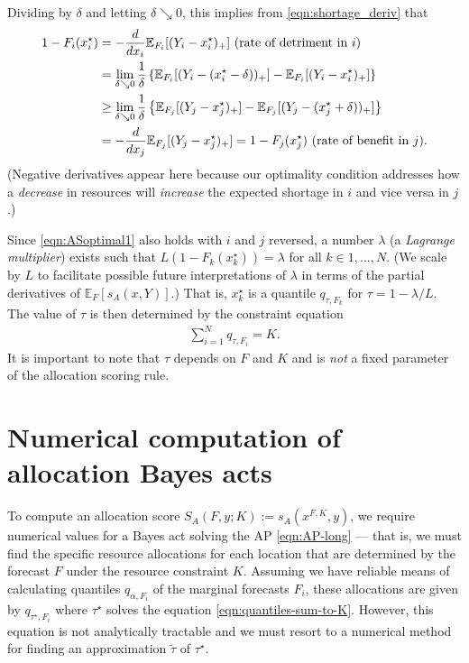 \documentclass{article}\usepackage[]{graphicx}\usepackage[]{xcolor}
\begin{document}
Dividing by $\delta$ and letting $\delta \searrow 0$, this implies from
\eqref{eqn:shortage_deriv} that
\begin{align}
1-F_i(x^{\star}_i) &= -\frac{d}{dx_i}\mathbb{E}_{F_i}[(Y_i - x^{\star}_i)_{+}] 
\text{ (rate of detriment in $i$) }\nonumber \\
&= \lim_{\delta \searrow 0} \frac{1}{\delta}
\left\{\mathbb{E}_{F_i}[(Y_i - (x^{\star}_i - \delta))_{+}] - \mathbb{E}_{F_i}[(Y_i - x^{\star}_i)_{+}]\right\}
\nonumber \\
&\geq
\lim_{\delta \searrow 0} \frac{1}{\delta}
\left\{\mathbb{E}_{F_j}[(Y_j - x^{\star}_j)_{+}] - \mathbb{E}_{F_j}[(Y_j - (x^{\star}_j + \delta))_{+}]\right\}
 \nonumber \\
 &= -\frac{d {} }{d {x_j}}\mathbb{E}_{F_j}[(Y_j - x^{\star}_j)_{+}] = 1-F_j(x^{\star}_j) 
 \text{ (rate of benefit in $j$).}\label{eqn:ASoptimal1}
\end{align}
(Negative derivatives appear here because our optimality condition addresses how a \emph{decrease} in resources will
 \emph{increase} the expected shortage in $i$ and vice versa in $j$.) 

Since \eqref{eqn:ASoptimal1} also holds with $i$ and $j$
reversed, a number $\lambda$ (a \emph{Lagrange multiplier}) exists such that
$L(1-F_k(x^{\star}_k)) = \lambda$ for all $k \in 1,\ldots,N$.
(We scale by $L$ to facilitate possible future interpretations of $\lambda$ in terms of the partial derivatives
of $\mathbb{E}_{F} [s_A(x, Y)]$.)
That is, $x^{\star}_k$ is a quantile $q_{\tau,F_k}$ for
$\tau = 1 - \lambda/L$. The value of $\tau$ is then determined by the constraint equation
\begin{align}
\sum_{i=1}^N q_{\tau,F_i} = K. \label{eqn:quantiles-sum-to-K}
\end{align}
It is important to note that $\tau$ depends on $F$ and $K$ and is \emph{not} a fixed parameter
of the allocation scoring rule.


\section{Numerical computation of allocation Bayes acts}
\label{sec:a:numeric}

To compute an allocation score $S_A(F,y;K) := s_A(x^{F,K},y)$, we require numerical values for a Bayes act solving the
AP \eqref{eqn:AP-long} --- that is, we must find the specific resource allocations for each location that are determined by
the forecast $F$ under the resource constraint $K$. Assuming we have reliable means of calculating quantiles
$q_{\alpha,F_i}$ of the marginal forecasts $F_i$, these allocations are given by $q_{\tau^{\star},F_i}$ where
$\tau^{\star}$ solves the equation \eqref{eqn:quantiles-sum-to-K}. However, this equation is not analytically tractable
and we must resort to a numerical method for finding an approximation $\tilde{\tau}$ of $\tau^{\star}$.
\end{document}
